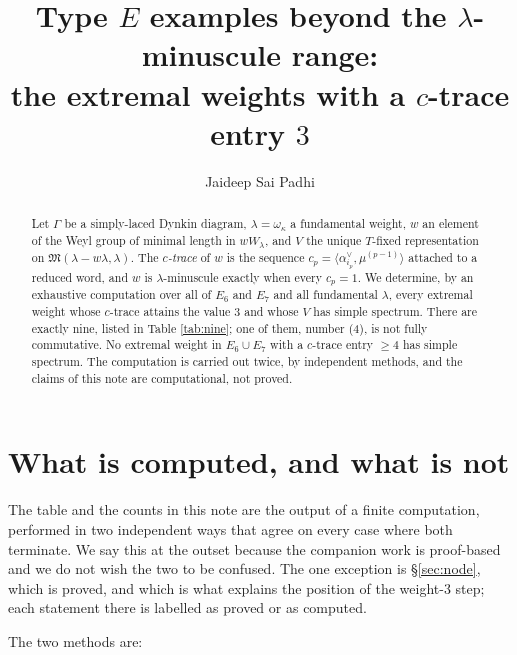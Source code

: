 \documentclass[reqno]{amsart}
\theoremstyle{plain}
\theoremstyle{definition}
\newcommand{\la}{\lambda}
\newcommand{\al}{\alpha}
\newcommand{\om}{\omega}
\newcommand{\ka}{\kappa}
\begin{document}
\title[Type $E$ examples with $c_p=3$]{Type $E$ examples beyond the
$\la$-minuscule range:\\ the extremal weights with a $c$-trace entry $3$}

\author{Jaideep Sai Padhi}
\address{Department of Computer Science, Purdue University, West Lafayette, IN 47907}

\begin{abstract}
Let $\Gamma$ be a simply-laced Dynkin diagram, $\la=\om_\ka$ a fundamental
weight, $w$ an element of the Weyl group of minimal length in $wW_\la$, and
$V$ the unique $T$-fixed representation on
$\mathfrak{M}(\la-w\la,\la)$.  The \emph{$c$-trace} of $w$ is the sequence
$c_p=\langle\al_{i_p}^\vee,\mu^{(p-1)}\rangle$ attached to a reduced word, and
$w$ is $\la$-minuscule exactly when every $c_p=1$.  We determine, by an
exhaustive computation over all of $E_6$ and $E_7$ and all fundamental
$\la$, every extremal weight whose $c$-trace attains the value $3$ and whose
$V$ has simple spectrum.  There are exactly nine, listed in Table
\ref{tab:nine}; one of them, number (4), is not fully commutative.  No
extremal weight in $E_6\cup E_7$ with a $c$-trace entry $\ge4$ has simple
spectrum.  The computation is carried out twice, by independent methods, and
the claims of this note are computational, not proved.
\end{abstract}

\maketitle

\section{What is computed, and what is not}\label{sec:scope}

The table and the counts in this note are the output of a finite computation,
performed in two independent ways that agree on every case where both
terminate.  We say this at the outset because the companion work is
proof-based and we do not wish the two to be confused.  The one exception is
\S\ref{sec:node}, which is proved, and which is what explains the position of
the weight-$3$ step; each statement there is labelled as proved or as
computed.

The two methods are:
\end{document}
